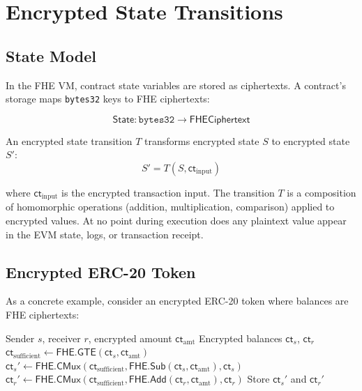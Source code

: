 \section{Encrypted State Transitions}

\label{sec:state-transitions}

\subsection{State Model}

In the FHE VM, contract state variables are stored as ciphertexts. A contract's
storage maps \texttt{bytes32} keys to FHE ciphertexts:

\[
  \textsf{State}: \texttt{bytes32} \to \textsf{FHECiphertext}
\]

An encrypted state transition $T$ transforms encrypted state $S$ to encrypted
state $S'$:
\[
  S' = T(S, \textsf{ct}_{\text{input}})
\]

where $\textsf{ct}_{\text{input}}$ is the encrypted transaction input. The transition
$T$ is a composition of homomorphic operations (addition, multiplication, comparison)
applied to encrypted values. At no point during execution does any plaintext value
appear in the EVM state, logs, or transaction receipt.

\subsection{Encrypted ERC-20 Token}

As a concrete example, consider an encrypted ERC-20 token where balances are FHE
ciphertexts:

\begin{algorithm}[ht]
\caption{Encrypted ERC-20 transfer (pseudocode).}
\label{alg:encrypted-transfer}
\begin{algorithmic}[1]
\Require Sender $s$, receiver $r$, encrypted amount $\textsf{ct}_{\text{amt}}$
\Require Encrypted balances $\textsf{ct}_{s}$, $\textsf{ct}_{r}$
\State $\textsf{ct}_{\text{sufficient}} \leftarrow \textsf{FHE.GTE}(\textsf{ct}_{s}, \textsf{ct}_{\text{amt}})$ 
\State $\textsf{ct}_{s}' \leftarrow \textsf{FHE.CMux}(\textsf{ct}_{\text{sufficient}}, \textsf{FHE.Sub}(\textsf{ct}_{s}, \textsf{ct}_{\text{amt}}), \textsf{ct}_{s})$
\State $\textsf{ct}_{r}' \leftarrow \textsf{FHE.CMux}(\textsf{ct}_{\text{sufficient}}, \textsf{FHE.Add}(\textsf{ct}_{r}, \textsf{ct}_{\text{amt}}), \textsf{ct}_{r})$
\State Store $\textsf{ct}_{s}'$ and $\textsf{ct}_{r}'$
\end{algorithmic}
\end{algorithm}

